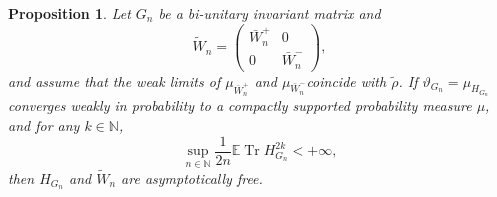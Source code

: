 \documentclass[11pt,oneside]{amsart}
\theoremstyle{plain}
\newtheorem{proposition}[theorem]{Proposition}
\numberwithin{equation}{section}
\newcommand{\N}{\mathbb{N}}
\newcommand{\E}{\mathbb{E}}
\DeclareMathOperator{\trace}{Tr}
\newcommand{\esd}[1]{\mu_{#1}}
\begin{document}
\begin{proposition}
\label{prop:freeness}
    Let $G_n$ be a bi-unitary invariant matrix and
    $$
    \widetilde{W}_{n}=\begin{pmatrix}  \bar{W}_n^+ & 0 \\ 0 & \bar{W}_n^- \end{pmatrix}, $$
    and assume that the weak limits of $\esd{\bar{W}_n^+}$ and $\esd{\bar{W}_n^-}$coincide with $\tilde \rho$.
    If $\vartheta_{G_n}=\esd{H_{G_n}}$ converges weakly in probability to a compactly supported probability measure $\mu$, and for any $k \in \N$,
    \begin{equation}
        \sup_{n \in \N} \frac 1{2n} \E \trace H_{G_n}^{2k}<+\infty,
    \end{equation} 
    then $H_{G_n}$ and $\widetilde{W}_n$ are asymptotically free.   
\end{proposition}
\end{document}
